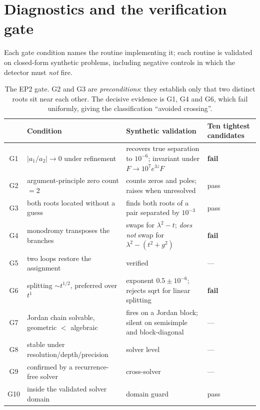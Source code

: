 \documentclass[aps,prd,onecolumn,superscriptaddress,nofootinbib]{revtex4-2}
\begin{document}
\section{Diagnostics and the verification gate}\label{sec:gate}

Each gate condition names the routine implementing it; each routine is
validated on closed-form synthetic problems, including negative controls in
which the detector must \emph{not} fire.

\begin{table}[H]
\centering\small
\begin{tabular}{clp{7.0cm}l}
\toprule
& Condition & Synthetic validation & Ten tightest candidates \\
\midrule
G1 & $|a_1/a_2|\to0$ under refinement &
  recovers true separation to $10^{-6}$; invariant under $F\to10^7e^{3z}F$ &
  \textbf{fail} \\
G2 & argument-principle zero count $=2$ &
  counts zeros and poles; raises when unresolved & pass \\
G3 & both roots located without a guess &
  finds both roots of a pair separated by $10^{-3}$ & pass \\
G4 & monodromy transposes the branches &
  swaps for $\lambda^2-t$; \emph{does not} swap for $\lambda^2-(t^2+g^2)$ &
  \textbf{fail} \\
G5 & two loops restore the assignment & verified & --- \\
G6 & splitting $\sim t^{1/2}$, preferred over $t^1$ &
  exponent $0.5\pm10^{-6}$; rejects sqrt for linear splitting &
  \textbf{fail} \\
G7 & Jordan chain solvable, geometric $<$ algebraic &
  fires on a Jordan block; silent on semisimple and block-diagonal & --- \\
G8 & stable under resolution/depth/precision & solver level & --- \\
G9 & confirmed by a recurrence-free solver & cross-solver & --- \\
G10 & inside the validated solver domain & domain guard & pass \\
\bottomrule
\end{tabular}
\caption{The EP2 gate. G2 and G3 are \emph{preconditions}: they establish only
that two distinct roots sit near each other. The decisive evidence is G1, G4
and G6, which fail uniformly, giving the classification ``avoided crossing''.}
\end{table}
\end{document}
